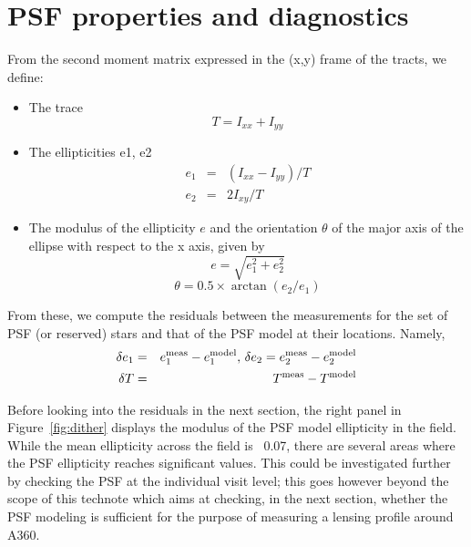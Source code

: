 \documentclass[SE,lsstdraft,authoryear,toc]{lsstdoc}
\begin{document}
\section{PSF properties and diagnostics}

From the second moment matrix expressed in the (x,y) frame of the tracts, we define:
\begin{itemize}
\item The trace 
\begin{equation}
T = I_{xx} + I_{yy}
\end{equation}

\item The ellipticities e1, e2
\begin{eqnarray}
  e_1 &=& (I_{xx} - I_{yy})/T \\
  e_2 &=& 2 I_{xy} / T
\end{eqnarray}

\item The modulus of the ellipticity $e$ and the orientation $\theta$ of the major axis of the ellipse with respect to the x axis, given by
\begin{equation} 
e = \sqrt{e_1^2 + e_2^2}
\label{eq:modulus}
\end{equation}
\begin{equation}
\theta = 0.5 \times \arctan(e_2/e_1)
\label{eq:theta}
\end{equation}
\end{itemize}


From these, we compute the residuals between the measurements for the set of PSF (or reserved) stars and that of the PSF model at their locations.  Namely,
\begin{eqnarray}
\delta e_1 &=& e_1^{\rm meas} - e_1^{\rm model}, \, \delta e_2 = e_2^{\rm meas} - e_2^{\rm model}\\
\delta T &=& T^{\rm meas} - T^{\rm model} 
\end{eqnarray}

Before looking into the residuals in the next section, the right panel in Figure~\ref{fig:dither} displays the modulus of the PSF model ellipticity in the field. While the mean ellipticity across the field is ~0.07, there are several areas where the PSF ellipticity reaches significant values. This could be investigated further by checking the PSF at the individual visit level; this goes however beyond the scope of this technote which aims at checking, in the next section, whether the PSF modeling is sufficient for the purpose of measuring a lensing profile around A360.
  
\end{document}
